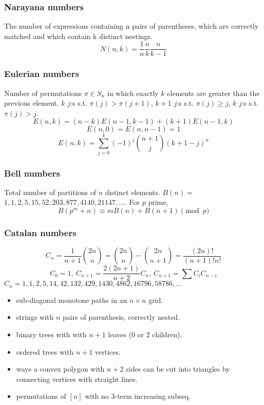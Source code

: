 \documentclass[
	a4paper,
	landscape,
	10pt,
]{article}
\begin{document}
\begin{multicols}{3}
	\subsubsection*{Narayana numbers} The number of expressions containing n pairs of parentheses, which are correctly matched and which contain k distinct nestings. 
		$$ N(n,k) = \frac{1}{n} \frac{n}{k} \frac{n}{k-1} $$

	\subsubsection*{Eulerian numbers}
		Number of permutations $\pi \in S_n$ in which exactly $k$ elements are greater than the previous element. $k$ $j$:s s.t. $\pi(j)>\pi(j+1)$, $k+1$ $j$:s s.t. $\pi(j)\geq j$, $k$ $j$:s s.t. $\pi(j)>j$.
		$$E(n,k) = (n-k)E(n-1,k-1) + (k+1)E(n-1,k)$$
		$$E(n,0) = E(n,n-1) = 1$$
		$$E(n,k) = \sum_{j=0}^k(-1)^j\binom{n+1}{j}(k+1-j)^n$$


	\subsubsection*{Bell numbers}
		Total number of partitions of $n$ distinct elements. $B(n) =$
		$1, 1, 2, 5, 15, 52, 203, 877, 4140, 21147, \dots$. For $p$ prime,
		\[ B(p^m+n)\equiv mB(n)+B(n+1) \pmod{p} \]

	\subsubsection*{Catalan numbers}
		\[ C_n=\frac{1}{n+1}\binom{2n}{n}= \binom{2n}{n}-\binom{2n}{n+1} = \frac{(2n)!}{(n+1)!n!} \]
		\[ C_0=1,\ C_{n+1} = \frac{2(2n+1)}{n+2}C_n,\ C_{n+1}=\sum C_iC_{n-i} \]
		${C_n = 1, 1, 2, 5, 14, 42, 132, 429, 1430, 4862, 16796, 58786, \dots}$
		\begin{itemize}[noitemsep]
			\item sub-diagonal monotone paths in an $n\times n$ grid.
			\item strings with $n$ pairs of parenthesis, correctly nested.
			\item binary trees with with $n+1$ leaves (0 or 2 children).
			\item ordered trees with $n+1$ vertices.
			\item ways a convex polygon with $n+2$ sides can be cut into triangles by connecting vertices with straight lines.
			\item permutations of $[n]$ with no 3-term increasing subseq.
		\end{itemize}


\end{multicols}
\end{document}
